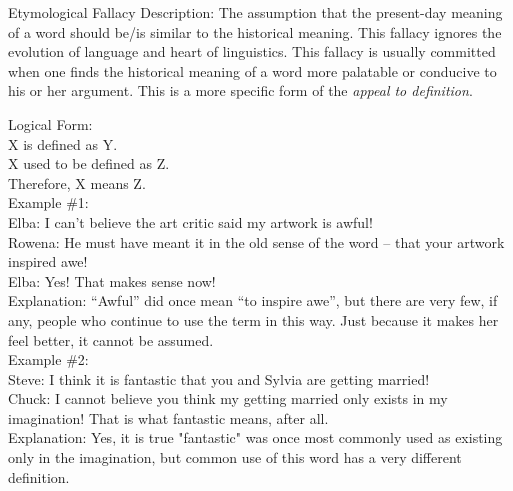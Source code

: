 \documentclass[a4paper,12pt,single,pdftex]{scrbook}
\begin{document}
Etymological Fallacy
    Description: The assumption that the present-day meaning of a word should be/is similar to the historical meaning.  This fallacy ignores the evolution of language and heart of linguistics.  This fallacy is usually committed when one finds the historical meaning of a word more palatable or conducive to his or her argument. This is a more specific form of the {\it appeal to definition}.

    
      Logical Form:
    \\

    
      X is defined as Y.
    \\

    
      X used to be defined as Z.
    \\

    
      Therefore, X means Z.
    \\

    
      Example \#1:
    \\

    
      Elba: I can’t believe the art critic said my artwork is awful!
    \\

    
      Rowena: He must have meant it in the old sense of the word -- that your artwork inspired awe!
    \\

    
      Elba: Yes!  That makes sense now!
    \\

    
      Explanation: “Awful” did once mean “to inspire awe”, but there are very few, if any, people who continue to use the term in this way.  Just because it makes her feel better, it cannot be assumed.
    \\

    
      Example \#2:
    \\

    
      Steve: I think it is fantastic that you and Sylvia are getting married!
    \\

    
      Chuck: I cannot believe you think my getting married only exists in my imagination!  That is what fantastic means, after all.
    \\

    
      Explanation: Yes, it is true "fantastic" was once most commonly used as existing only in the imagination, but common use of this word has a very different definition.
    \\
\end{document}
